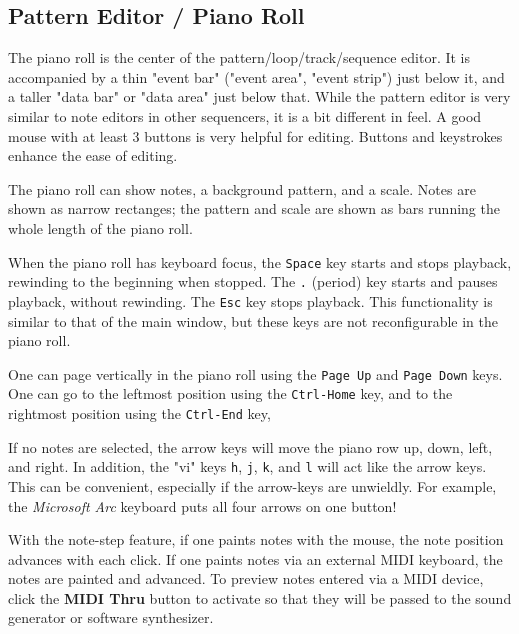 \subsection{Pattern Editor / Piano Roll}
\label{subsec:pattern_editor_piano_roll}

   The piano roll is the center of the pattern/loop/track/sequence editor.
   It is accompanied by a thin "event bar" ("event area", "event strip")
   just below it,
   and a taller "data bar" or "data area" just below that.
   While the pattern
   editor is very similar to note editors in other sequencers, it is a bit
   different in feel.  A good mouse with at least 3 buttons is very helpful
   for editing.  Buttons and keystrokes enhance the ease of editing.

   The piano roll can show notes, a background pattern, and a scale.
   Notes are shown as narrow rectanges; the pattern and scale are
   shown as bars running the whole length of the piano roll.

   When the piano roll has keyboard focus, the \texttt{Space} key
   starts and stops playback, rewinding to the beginning when stopped.
   The \texttt{.} (period) key starts and pauses playback, without
   rewinding.
   The \texttt{Esc} key stops playback.
   This functionality is similar to that of the main window, but
   these keys are not reconfigurable in the piano roll.

   One can page vertically in the piano roll using the
    \texttt{Page Up} and 
    \texttt{Page Down} keys.
   One can go to the leftmost position using the 
    \texttt{Ctrl-Home} key,
   and to the rightmost position using the
    \texttt{Ctrl-End} key,

   If no notes are selected, the arrow keys will move the piano row up, down,
   left, and right.
   In addition, the "vi" keys \texttt{h}, \texttt{j}, \texttt{k}, and
   \texttt{l} will act like the arrow keys. This can be convenient, especially
   if the arrow-keys are unwieldly.  For example, the
   \textsl{Microsoft Arc} keyboard puts all four arrows on one button!

   With the note-step feature, if one paints notes with the mouse,
   the note position advances with each click.
   If one paints notes via an external MIDI keyboard, the notes are painted and
   advanced.
   To preview notes entered via a MIDI device, click the
   \textbf{MIDI Thru} button to activate so that they will be
   passed to the sound generator or software synthesizer.

